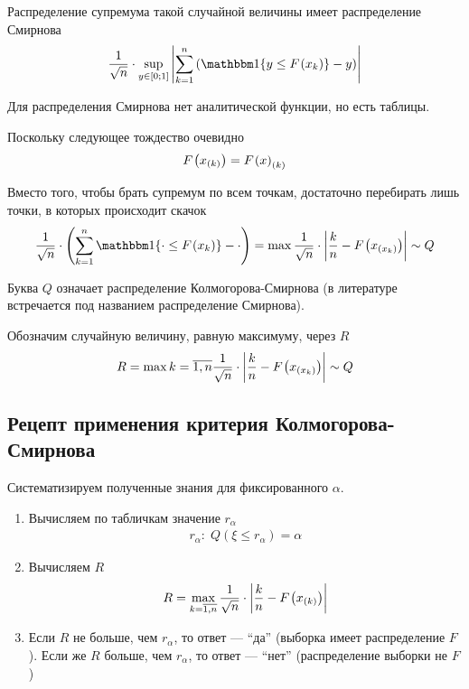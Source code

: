 Распределение супремума такой случайной величины имеет распределение Смирнова
\begin{align*}
    \frac{1}{\sqrt{n}} \cdot \sup\limits_{y \in \left[ 0; 1 \right]}
        {\left| \sum_{k=1}^{n} \left( \Indicator{y \le \cdf{x_k}} - y  \right)
        \right|}
\end{align*}

Для распределения Смирнова нет аналитической функции, но есть таблицы.

Поскольку следующее тождество очевидно
\begin{align*}
    F_{}\left(x_{\left( k \right)}\right) = F_{}\left(x\right)_{\left( k \right)}
\end{align*}

Вместо того, чтобы брать супремум по всем точкам, достаточно перебирать лишь
точки, в которых происходит скачок
\begin{align*}
    \frac{1}{\sqrt{n}} \cdot \left(
        \sum_{k=1}^{n}\Indicator{\cdot \le \cdf{x_k}} - \cdot \right)
    = \max{\frac{1}{\sqrt{n}} \cdot \left| \frac{k}{n}
        - \cdf{x_{\left( x_k \right)}} \right|}
    \sim Q
\end{align*}

Буква $Q$ означает распределение Колмогорова-Смирнова (в литературе встречается
под названием распределение Смирнова).

Обозначим случайную величину, равную максимуму, через $R$
\begin{align*}
    R = \max\limits{k=\overline{1,n}}{
        \frac{1}{\sqrt{n}} \cdot \left| \frac{k}{n}
            - F_{}\left(x_{\left( x_k \right)}\right) \right|}
    \sim Q
\end{align*}

\subsection{Рецепт применения критерия Колмогорова-Смирнова}

Систематизируем полученные знания для фиксированного $\alpha$.

\begin{enumerate}
    \item Вычисляем по табличкам значение $r_{\alpha}$
        \begin{align*}
            r_{\alpha}:\; Q\left( \xi \le r_{\alpha} \right) = \alpha
        \end{align*}
    \item Вычисляем $R$
        \begin{align*}
            R = \max\limits_{k=\overline{1,n}}{
                \frac{1}{\sqrt{n}} \cdot \left| \frac{k}{n}
                    - F_{}\left(x_{\left( k \right)}\right) \right|}
        \end{align*}
    \item Если $R$ не больше, чем $r_{\alpha}$, то ответ --- ``да''
        (выборка имеет распределение $F$).
        Если же $R$ больше, чем $r_{\alpha}$, то ответ --- ``нет''
        (распределение выборки не $F$)
\end{enumerate}

